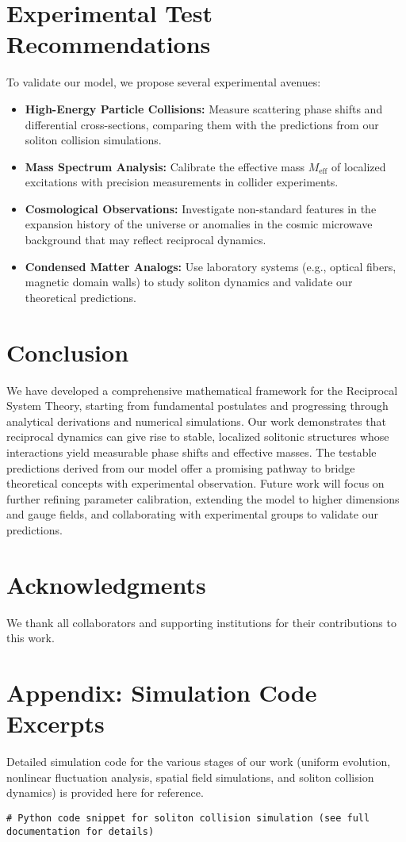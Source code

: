 \documentclass{article}
\begin{document}
\section{Experimental Test Recommendations}
To validate our model, we propose several experimental avenues:
\begin{itemize}
    \item \textbf{High-Energy Particle Collisions:} Measure scattering phase shifts and differential cross-sections, comparing them with the predictions from our soliton collision simulations.
    \item \textbf{Mass Spectrum Analysis:} Calibrate the effective mass \(M_{\text{eff}}\) of localized excitations with precision measurements in collider experiments.
    \item \textbf{Cosmological Observations:} Investigate non-standard features in the expansion history of the universe or anomalies in the cosmic microwave background that may reflect reciprocal dynamics.
    \item \textbf{Condensed Matter Analogs:} Use laboratory systems (e.g., optical fibers, magnetic domain walls) to study soliton dynamics and validate our theoretical predictions.
\end{itemize}

\section{Conclusion}
We have developed a comprehensive mathematical framework for the Reciprocal System Theory, starting from fundamental postulates and progressing through analytical derivations and numerical simulations. Our work demonstrates that reciprocal dynamics can give rise to stable, localized solitonic structures whose interactions yield measurable phase shifts and effective masses. The testable predictions derived from our model offer a promising pathway to bridge theoretical concepts with experimental observation. Future work will focus on further refining parameter calibration, extending the model to higher dimensions and gauge fields, and collaborating with experimental groups to validate our predictions.

\section*{Acknowledgments}
We thank all collaborators and supporting institutions for their contributions to this work.

\appendix
\section{Appendix: Simulation Code Excerpts}
Detailed simulation code for the various stages of our work (uniform evolution, nonlinear fluctuation analysis, spatial field simulations, and soliton collision dynamics) is provided here for reference.

\verb|# Python code snippet for soliton collision simulation (see full documentation for details)|
\end{document}
